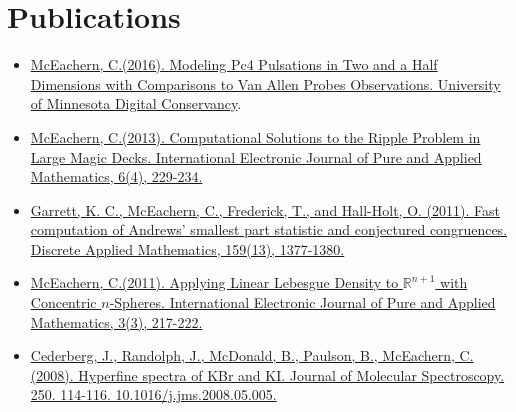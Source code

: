 \documentclass[12pt,letterpaper]{article}
\newcommand{\ResumeSection}[1]{\section*{{\color{MidnightBlue}#1 \sout{\hfill}}}}
\begin{document}

\ResumeSection{Publications}

\begin{itemize}[leftmargin=\parindent]
    \parskip=0.1em
    \itemsep=1.2em

    \item \href{http://hdl.handle.net/11299/181780}{McEachern, C.\footnotemark[1] (2016). Modeling Pc4 Pulsations in Two and a Half Dimensions with Comparisons to Van Allen Probes Observations. University of Minnesota Digital Conservancy}.
    \item \href{http://e.ijpam.eu/contents/articles/201300604003.pdf}{McEachern, C.\footnotemark[1] (2013). Computational Solutions to the Ripple Problem in Large Magic Decks. International Electronic Journal of Pure and Applied Mathematics, 6(4), 229-234.}
    \item \href{https://doi.org/10.1016/j.dam.2011.04.022}{Garrett, K. C., McEachern, C.\footnotemark[1], Frederick, T., and Hall-Holt, O. (2011). Fast computation of Andrews’ smallest part statistic and conjectured congruences. Discrete Applied Mathematics, 159(13), 1377-1380.}
    \item \href{http://e.ijpam.eu/contents/articles/201100303004.pdf}{McEachern, C.\footnotemark[1] (2011). Applying Linear Lebesgue Density to $\mathbb{R}^{n+1}$ with Concentric $n$-Spheres. International Electronic Journal of Pure and Applied Mathematics, 3(3), 217-222.}
    \item \href{https://www.sciencedirect.com/science/article/abs/pii/S0022285208001872}{Cederberg, J., Randolph, J., McDonald, B., Paulson, B., McEachern, C.\footnotemark[1] (2008). Hyperfine spectra of KBr and KI. Journal of Molecular Spectroscopy. 250. 114-116. 10.1016/j.jms.2008.05.005.}

\end{itemize}

\end{document}
